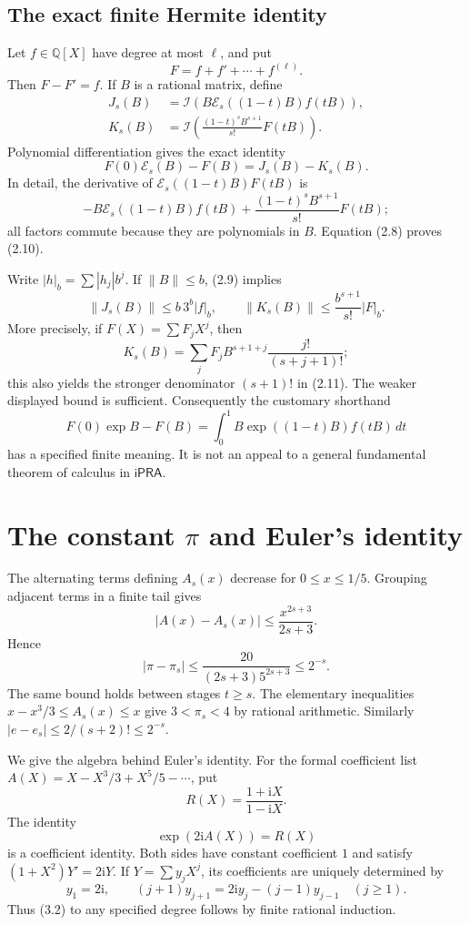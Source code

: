 \documentclass[11pt]{article}
\theoremstyle{definition}
\newcommand{\ipra}{\mathsf{iPRA}}
\newcommand{\Q}{\mathbb Q}
\newcommand{\ii}{\mathrm i}
\newcommand{\Exp}{\mathcal E}
\newcommand{\FPint}{\mathcal I}
\begin{document}
\subsection{The exact finite Hermite identity}\label{sec:finitehermite}

Let \(f\in\Q[X]\) have degree at most \(\ell\), and put
\[
 F=f+f'+\cdots+f^{(\ell)}.
\]
Then \(F-F'=f\). If \(B\) is a rational matrix, define
\[
 \begin{split}
 J_s(B)&=\FPint\!\left(B\Exp_s((1-t)B)f(tB)\right),\\
 K_s(B)&=\FPint\!\left(
       \frac{(1-t)^sB^{s+1}}{s!}F(tB)\right).
 \end{split}
\]
Polynomial differentiation gives the exact identity
\[
 F(0)\Exp_s(B)-F(B)=J_s(B)-K_s(B). \tag{2.10}
\]
In detail, the derivative of
\(\Exp_s((1-t)B)F(tB)\) is
\[
 -B\Exp_s((1-t)B)f(tB)
 +\frac{(1-t)^sB^{s+1}}{s!}F(tB);
\]
all factors commute because they are polynomials in \(B\).
Equation (2.8) proves (2.10).

Write \(|h|_b=\sum|h_j|b^j\). If \(\|B\|\le b\), (2.9) implies
\[
 \|J_s(B)\|\le b\,3^b|f|_b,\qquad
 \|K_s(B)\|\le\frac{b^{s+1}}{s!}|F|_b. \tag{2.11}
\]
More precisely, if \(F(X)=\sum F_jX^j\), then
\[
 K_s(B)=\sum_j F_j B^{s+1+j}\frac{j!}{(s+j+1)!};
\]
this also yields the stronger denominator \((s+1)!\) in (2.11).
The weaker displayed bound is sufficient.
Consequently the customary shorthand
\[
 F(0)\exp B-F(B)
 =\int_0^1B\exp((1-t)B)f(tB)\,dt
 \tag{2.12}
\]
has a specified finite meaning. It is not an appeal to a general
fundamental theorem of calculus in \(\ipra\).

\section{The constant \texorpdfstring{\(\pi\)}{pi} and Euler's identity}\label{sec:pi-name}

The alternating terms defining \(A_s(x)\) decrease for \(0\le x\le1/5\).
Grouping adjacent terms in a finite tail gives
\[
 |A(x)-A_s(x)|\le\frac{x^{2s+3}}{2s+3}.
\]
Hence
\[
 |\pi-\pi_s|
 \le\frac{20}{(2s+3)5^{2s+3}}\le2^{-s}. \tag{3.1}
\]
The same bound holds between stages \(t\ge s\).
The elementary inequalities \(x-x^3/3\le A_s(x)\le x\)
give \(3<\pi_s<4\) by rational arithmetic. Similarly
\(|e-e_s|\le2/(s+2)!\le2^{-s}\).

We give the algebra behind Euler's identity.
For the formal coefficient list
\(A(X)=X-X^3/3+X^5/5-\cdots\), put
\[
 R(X)=\frac{1+\ii X}{1-\ii X}.
\]
The identity
\[
 \exp(2\ii A(X))=R(X) \tag{3.2}
\]
is a coefficient identity. Both sides have constant coefficient \(1\) and
satisfy \((1+X^2)Y'=2\ii Y\).
If \(Y=\sum y_jX^j\), its coefficients are uniquely determined by
\[
 y_1=2\ii,\qquad
 (j+1)y_{j+1}=2\ii y_j-(j-1)y_{j-1}\quad(j\ge1).
 \tag{3.3}
\]
Thus (3.2) to any specified degree follows by finite rational induction.
\end{document}

